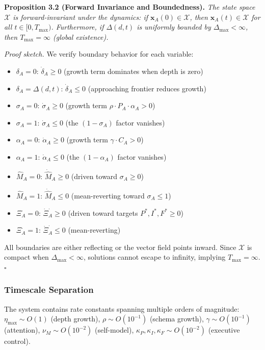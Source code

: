 \documentclass[11pt,a4paper]{article}
\begin{document}
\textbf{Proposition 3.2 (Forward Invariance and Boundedness).}
\textit{The state space $\mathcal{X}$ is forward-invariant under the dynamics:
if $\mathbf{x}_A(0) \in \mathcal{X}$, then $\mathbf{x}_A(t) \in \mathcal{X}$
for all $t \in [0, T_{\max})$. Furthermore, if $\Delta(d,t)$ is uniformly
bounded by $\Delta_{\max} < \infty$, then $T_{\max} = \infty$ (global existence).}

\textit{Proof sketch.} We verify boundary behavior for each variable:
\begin{itemize}[nosep]
\item $\delta_A = 0$: $\dot{\delta}_A \geq 0$ (growth term dominates when depth is zero)
\item $\delta_A = \Delta(d,t)$: $\dot{\delta}_A \leq 0$ (approaching frontier reduces growth)
\item $\sigma_A = 0$: $\dot{\sigma}_A \geq 0$ (growth term $\rho \cdot P_A \cdot \alpha_A > 0$)
\item $\sigma_A = 1$: $\dot{\sigma}_A \leq 0$ (the $(1-\sigma_A)$ factor vanishes)
\item $\alpha_A = 0$: $\dot{\alpha}_A \geq 0$ (growth term $\gamma \cdot C_A > 0$)
\item $\alpha_A = 1$: $\dot{\alpha}_A \leq 0$ (the $(1-\alpha_A)$ factor vanishes)
\item $\hat{M}_A = 0$: $\dot{\hat{M}}_A \geq 0$ (driven toward $\sigma_A \geq 0$)
\item $\hat{M}_A = 1$: $\dot{\hat{M}}_A \leq 0$ (mean-reverting toward $\sigma_A \leq 1$)
\item $\Xi_A^{\cdot} = 0$: $\dot{\Xi}_A^{\cdot} \geq 0$ (driven toward targets $P^*, I^*, F^* \geq 0$)
\item $\Xi_A^{\cdot} = 1$: $\dot{\Xi}_A^{\cdot} \leq 0$ (mean-reverting)
\end{itemize}
All boundaries are either reflecting or the vector field points inward.
Since $\mathcal{X}$ is compact when $\Delta_{\max} < \infty$, solutions
cannot escape to infinity, implying $T_{\max} = \infty$. $\square$

\subsubsection{Timescale Separation}\label{sec:timescale}

The system contains rate constants spanning multiple orders of magnitude:
$\eta_{\max} \sim O(1)$ (depth growth), $\rho \sim O(10^{-1})$ (schema growth),
$\gamma \sim O(10^{-1})$ (attention), $\nu_M \sim O(10^{-2})$ (self-model),
$\kappa_P, \kappa_I, \kappa_F \sim O(10^{-2})$ (executive control).
\end{document}
